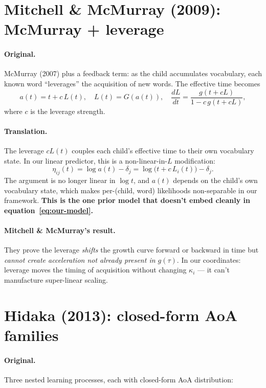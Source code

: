 \documentclass[11pt]{article}
\begin{document}
\section{Mitchell \& McMurray (2009): McMurray + leverage}

\paragraph{Original.}
McMurray (2007) plus a feedback term: as the child accumulates
vocabulary, each known word ``leverages'' the acquisition of new
words. The effective time becomes
\begin{equation}
a(t) = t + c\,L(t),
\quad
L(t) = G(a(t)),
\quad
\frac{dL}{dt} = \frac{g(t + cL)}{1 - c\,g(t+cL)},
\end{equation}
where $c$ is the leverage strength.

\paragraph{Translation.}
The leverage $cL(t)$ couples each child's effective time to their own
vocabulary state. In our linear predictor, this is a non-linear-in-$L$
modification:
\begin{equation}
\eta_{ij}(t) = \log a(t) - \delta_j = \log\!\big(t + c\,L_i(t)\big) - \delta_j.
\end{equation}
The argument is no longer linear in $\log t$, and $a(t)$ depends on
the child's own vocabulary state, which makes per-(child, word) likelihoods
non-separable in our framework. \textbf{This is the one prior model
that doesn't embed cleanly in
equation~\eqref{eq:our-model}.}

\paragraph{Mitchell \& McMurray's result.} They prove the leverage
\emph{shifts} the growth curve forward or backward in time but
\emph{cannot create acceleration not already present in $g(\tau)$}.
In our coordinates: leverage moves the timing of acquisition without
changing $\kappa_i$ — it can't manufacture super-linear scaling.

\section{Hidaka (2013): closed-form AoA families}

\paragraph{Original.}
Three nested learning processes, each with closed-form AoA distribution:
\end{document}
